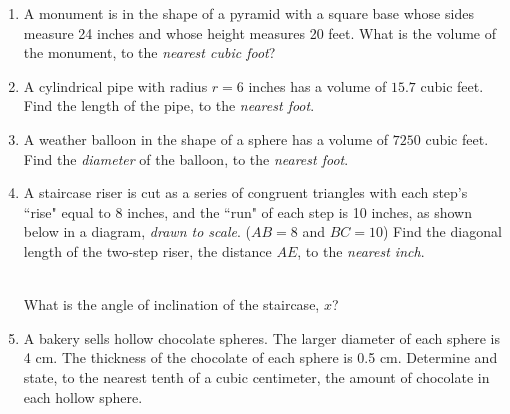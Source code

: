 \documentclass[12pt, twoside]{article}
\begin{document}
\begin{enumerate}
\item A monument is in the shape of a pyramid with a square base whose sides measure 24 inches and whose height measures 20 feet. What is the volume of the monument, to the \emph{nearest cubic foot}? \vspace{4cm}

\item A cylindrical pipe with radius $r=6$ inches has a volume of $15.7$ cubic feet. Find the length of the pipe, to the \emph{nearest foot}. \vspace{4cm}

\item A weather balloon in the shape of a sphere has a volume of $7250$ cubic feet. Find the \emph{diameter} of the balloon, to the \emph{nearest foot}. \vspace{3.5cm}
  

\newpage
\item A staircase riser is cut as a series of congruent triangles with each step's ``rise" equal to 8 inches, and the ``run" of each step is 10 inches, as shown below in a diagram, \emph{drawn to scale}. ($AB=8$ and $BC=10$) Find the diagonal length of the two-step riser, the distance $AE$, to the \emph{nearest inch}.\\[0.5cm]
        \\
      What is the angle of inclination of the staircase, $x$?
\vspace{1cm}

\item A bakery sells hollow chocolate spheres. The larger diameter of each sphere is 4 cm. The thickness of the chocolate of each sphere is 0.5 cm. Determine and state, to the nearest tenth of a cubic centimeter, the amount of chocolate in each hollow sphere.
    \begin{flushright}
    \end{flushright}

\end{enumerate}
\end{document}
